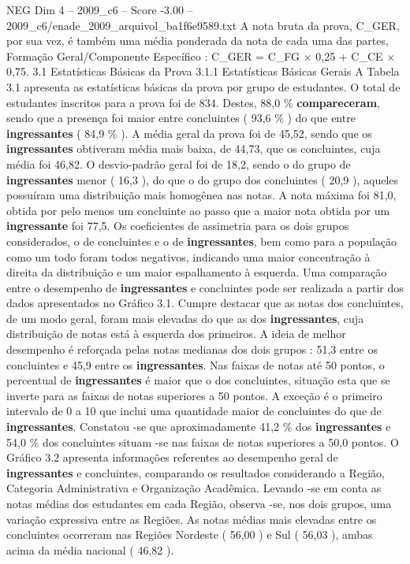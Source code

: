 \begin{textsample}{NEG Dim 4 – 2009\_c6 – Score -3.00 – 2009\_c6/enade\_2009\_arquivol\_ba1f6e9589.txt}
A nota bruta da prova, C\_GER, por sua vez, é também uma média ponderada da nota de cada uma das partes, Formação Geral/Componente Específico : C\_GER = C\_FG × 0,25 + C\_CE × 0,75. 3.1 Estatísticas Básicas da Prova 3.1.1 Estatísticas Básicas Gerais A Tabela 3.1 apresenta as estatísticas básicas da prova por grupo de estudantes.
O total de estudantes inscritos para a prova foi de 834.
Destes, 88,0 \% \textbf{compareceram}, sendo que a presença foi maior entre concluintes ( 93,6 \% ) do que entre \textbf{ingressantes} ( 84,9 \% ).
A média geral da prova foi de 45,52, sendo que os \textbf{ingressantes} obtiveram média mais baixa, de 44,73, que os concluintes, cuja média foi 46,82.
O desvio-padrão geral foi de 18,2, sendo o do grupo de \textbf{ingressantes} menor ( 16,3 ), do que o do grupo dos concluintes ( 20,9 ), aqueles possuíram uma distribuição mais homogênea nas notas.
A nota máxima foi 81,0, obtida por pelo menos um concluinte ao passo que a maior nota obtida por um \textbf{ingressante} foi 77,5.
Os coeficientes de assimetria para os dois grupos considerados, o de concluintes e o de \textbf{ingressantes}, bem como para a população como um todo foram todos negativos, indicando uma maior concentração à direita da distribuição e um maior espalhamento à esquerda.
Uma comparação entre o desempenho de \textbf{ingressantes} e concluintes pode ser realizada a partir dos dados apresentados no Gráfico 3.1.
Cumpre destacar que as notas dos concluintes, de um modo geral, foram mais elevadas do que as dos \textbf{ingressantes}, cuja distribuição de notas está à esquerda dos primeiros.
A ideia de melhor desempenho é reforçada pelas notas medianas dos dois grupos : 51,3 entre os concluintes e 45,9 entre os \textbf{ingressantes}.
Nas faixas de notas até 50 pontos, o percentual de \textbf{ingressantes} é maior que o dos concluintes, situação esta que se inverte para as faixas de notas superiores a 50 pontos.
A exceção é o primeiro intervalo de 0 a 10 que inclui uma quantidade maior de concluintes do que de \textbf{ingressantes}.
Constatou -se que aproximadamente 41,2 \% dos \textbf{ingressantes} e 54,0 \% dos concluintes situam -se nas faixas de notas superiores a 50,0 pontos.
O Gráfico 3.2 apresenta informações referentes ao desempenho geral de \textbf{ingressantes} e concluintes, comparando os resultados considerando a Região, Categoria Administrativa e Organização Acadêmica.
Levando -se em conta as notas médias dos estudantes em cada Região, observa -se, nos dois grupos, uma variação expressiva entre as Regiões.
As notas médias mais elevadas entre os concluintes ocorreram nas Regiões Nordeste ( 56,00 ) e Sul ( 56,03 ), ambas acima da média nacional ( 46,82 ).

\end{textsample}
